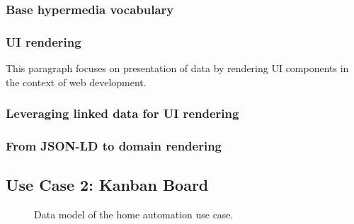 \subsubsection{Base hypermedia vocabulary}\label{basevocab}
\subsubsection{UI rendering}\label{genericrendering}
This paragraph focuses on presentation of data by rendering UI components in the context of web development.
\subsubsection{Leveraging linked data for UI rendering}\label{linkeddatarendering}
\subsubsection{From JSON-LD to domain rendering}\label{domainrendering}

\subsection{Use Case 2: Kanban Board}\label{usecases}

\begin{figure}[!htb]
  \caption{\label{fig:my-label} Data model of the home automation use case.}
\end{figure}

